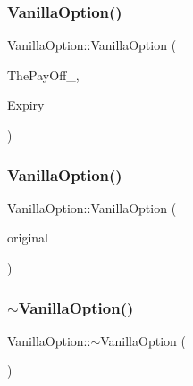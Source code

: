 \hypertarget{classVanillaOption_a6da83c3102ce2a55440108768b0138c7}{}\label{classVanillaOption_a6da83c3102ce2a55440108768b0138c7} 
\subsubsection{\texorpdfstring{Vanilla\+Option()}{VanillaOption()}\hspace{0.1cm}{\footnotesize\ttfamily [2/3]}}
{\footnotesize\ttfamily Vanilla\+Option\+::\+Vanilla\+Option (\begin{DoxyParamCaption}\item[{const \hyperlink{classPayOff}{Pay\+Off} \&}]{The\+Pay\+Off\+\_\+,  }\item[{double}]{Expiry\+\_\+ }\end{DoxyParamCaption})}

\hypertarget{classVanillaOption_a2eea352d4a1afbff2807f248dd1fb109}{}\label{classVanillaOption_a2eea352d4a1afbff2807f248dd1fb109} 
\subsubsection{\texorpdfstring{Vanilla\+Option()}{VanillaOption()}\hspace{0.1cm}{\footnotesize\ttfamily [3/3]}}
{\footnotesize\ttfamily Vanilla\+Option\+::\+Vanilla\+Option (\begin{DoxyParamCaption}\item[{const \hyperlink{classVanillaOption}{Vanilla\+Option} \&}]{original }\end{DoxyParamCaption})}

\hypertarget{classVanillaOption_a77f6412e2aef7b4fbc7203fdb59f270d}{}\label{classVanillaOption_a77f6412e2aef7b4fbc7203fdb59f270d} 
\subsubsection{\texorpdfstring{$\sim$\+Vanilla\+Option()}{~VanillaOption()}}
{\footnotesize\ttfamily Vanilla\+Option\+::$\sim$\+Vanilla\+Option (\begin{DoxyParamCaption}{ }\end{DoxyParamCaption})}



